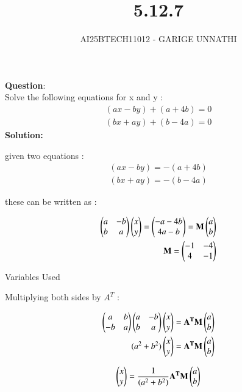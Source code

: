 \documentclass[journal]{IEEEtran}
\begin{document}

\vspace{3cm}

\title{5.12.7}
\author{AI25BTECH11012 - GARIGE UNNATHI}
{\let\newpage\relax\maketitle}


\renewcommand{\thefigure}{\theenumi}
\renewcommand{\thetable}{\theenumi}
\setlength{\intextsep}{10pt} %


\renewcommand{\thetable}{\theenumi}


\textbf{Question}:\\
 Solve the following equations for x and y :
 \begin{align*}
     (ax - by) + (a + 4b)= 0 \\
     (bx + ay) + (b - 4a)= 0
 \end{align*}
\textbf{Solution: }

given two equations :
 \begin{align}
     (ax - by) =  -(a + 4b) \\
     (bx + ay) = -(b - 4a)
 \end{align}

 these can be written as :

 \begin{align}
     \begin{pmatrix}a & -b \\ b & a\end{pmatrix}\begin{pmatrix}x \\ y\end{pmatrix} = \begin{pmatrix}-a-4b \\ 4a -b\end{pmatrix} = \mathbf{M}\begin{pmatrix}a \\ b\end{pmatrix} \\
     \mathbf{M} = \begin{pmatrix}-1 & -4 \\ 4 & -1\end{pmatrix}
 \end{align}

 \begin{table}[h!]    
      \centering
      
      \caption{Variables Used}
      \label{}
    \end{table}

Multiplying both sides by $A^{T}$ :

\begin{align}
    \begin{pmatrix}a & b\\ -b & a\end{pmatrix}\begin{pmatrix}a & -b\\b & a\end{pmatrix}\begin{pmatrix}x \\ y\end{pmatrix} = \mathbf{A^{T}}\mathbf{M}\begin{pmatrix}a \\ b\end{pmatrix}\\
    (a^{2} + b^{2})\begin{pmatrix}x \\y\end{pmatrix} = \mathbf{A^{T}}\mathbf{M}\begin{pmatrix}a \\ b\end{pmatrix}
\end{align}

\begin{align}
    \begin{pmatrix}x \\ y\end{pmatrix} = \frac{1}{(a^{2} + b^{2})} \mathbf{A^{T}}\mathbf{M}\begin{pmatrix}a \\ b\end{pmatrix}
\end{align}
\end{document}
